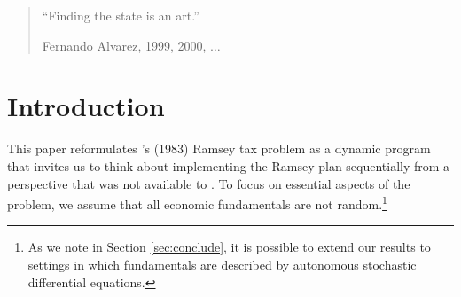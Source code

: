 \documentclass[12pt]{article}
\newcommand{\NW}[1]{{\textcolor{blue}{#1}}}
\newcommand{\TS}[1]{{\textcolor{magenta}{#1}}}
\begin{document}
\clearpage
{}
\setcounter{page}{1}
\newpage

\begin{quote}
``Finding the state is an art.''

\quad \quad Fernando Alvarez, 1999, 2000, $\ldots$

\end{quote}


\section{Introduction}\label{sec:intro}


%
% 

This paper reformulates  \citeauthor{LucasStokey1983}'s (1983) Ramsey tax problem %
as a dynamic program that invites   %
 us to think about implementing the Ramsey plan sequentially  from a perspective that was not available to \citeauthor{LucasStokey1983}.  To focus on essential aspects of the problem, we 
 assume that all economic fundamentals are not random.\footnote{As we note in Section \ref{sec:conclude},  it is possible to extend our results to settings in which fundamentals are described by autonomous stochastic differential equations.} 

%
\end{document}

